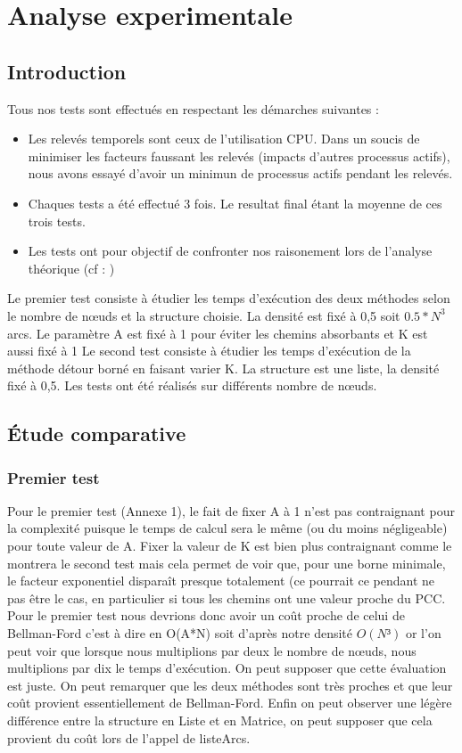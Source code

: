 \chapter{Analyse experimentale}
\section{Introduction}
Tous nos tests sont effectués en respectant les démarches suivantes : 
\begin{itemize}
\item
Les relevés temporels sont ceux de l'utilisation CPU. Dans un soucis de minimiser les facteurs faussant les relevés (impacts d'autres processus actifs), nous avons essayé d'avoir un minimun de processus actifs pendant les relevés.
\item
Chaques tests a été effectué 3 fois. Le resultat final étant la moyenne de ces trois tests.
\item
Les tests ont pour objectif de confronter nos raisonement lors de l'analyse théorique (cf : )

\end{itemize}
Le premier test consiste à étudier les temps d’exécution des deux méthodes selon le nombre de nœuds et la structure choisie. La densité est fixé à 0,5 soit $0.5*N^3$ arcs. Le paramètre A est fixé à 1 pour éviter les chemins absorbants et K est aussi fixé à 1
Le second test consiste à étudier les temps d'exécution de la méthode détour borné en faisant varier K. La structure est une liste, la densité fixé à 0,5. Les tests ont été réalisés sur différents nombre de nœuds.
\section{Étude comparative}
\subsection{Premier test}
Pour le premier test (Annexe 1), le fait de fixer A à 1 n'est pas contraignant pour la complexité puisque le temps de calcul sera le même (ou du moins négligeable) pour toute valeur de A. Fixer la valeur de K est bien plus contraignant comme le montrera le second test mais cela permet de voir que, pour une borne minimale, le facteur exponentiel disparaît presque totalement (ce pourrait ce pendant ne pas être le cas, en particulier si tous les chemins ont une valeur proche du PCC.
Pour le premier test nous devrions donc avoir un coût proche de celui de Bellman-Ford c'est à dire en O(A*N) soit d'après notre densité $O(N³)$ or l'on peut voir que lorsque nous multiplions par deux le nombre de nœuds, nous multiplions par dix le temps d'exécution. On peut supposer que cette évaluation est juste. On peut remarquer que les deux méthodes sont très proches et que leur coût provient essentiellement de Bellman-Ford. Enfin on peut observer une légère différence entre la structure en Liste et en Matrice, on peut supposer que cela provient du coût lors de l'appel de listeArcs. 
